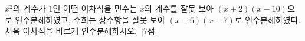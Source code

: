 $x^2$의 계수가 $1$인 어떤 이차식을 민수는 $x$의 계수를 잘못 보아 $(x+2)(x-10)$으로 인수분해하였고, 수희는 상수항을 잘못 보아 $(x+6)(x-7)$로 인수분해하였다. 처음 이차식을 바르게 인수분해하시오.~\mbox{\mbox{[7점]}}
